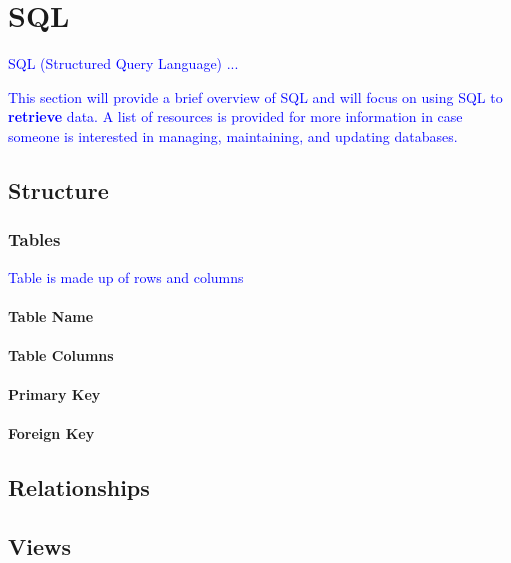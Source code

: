 \section{SQL}


\textcolor{blue}{SQL (Structured Query Language) ...}


\textcolor{blue}{This section will provide a brief overview of SQL and will focus on using SQL to \textbf{retrieve} data. A list of resources is provided for more information in case someone is interested in managing, maintaining, and updating databases.}

\subsection{Structure}


\subsubsection{Tables}

\textcolor{blue}{Table is made up of rows and columns}

\paragraph{Table Name}

\paragraph{Table Columns}

\paragraph{Primary Key}

\paragraph{Foreign Key}

\subsection{Relationships}

\subsection{Views}


